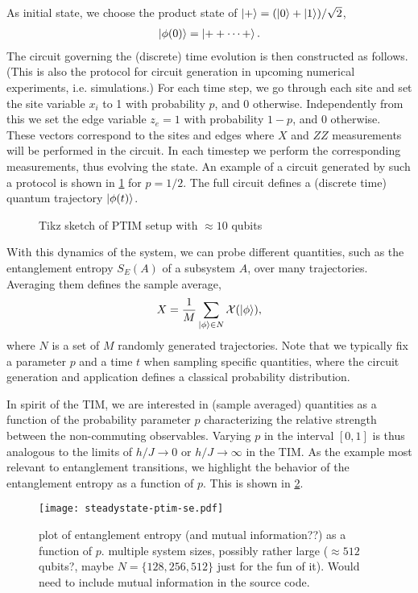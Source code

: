 As initial state, we choose the product state of $\ket{+} = (\ket{0} + \ket{1})
/ \sqrt{2}$,
\begin{align}
  \ket{\phi(0)} = \ket{++\cdots +}
.\end{align}
The circuit governing the (discrete) time evolution is then constructed as
follows. (This is also the protocol for circuit generation in upcoming numerical
experiments, i.e. simulations.) For each time step, we go through each site and
set the site variable $x_i$ to 1 with probability $p$, and 0 otherwise.
Independently from this we set the edge variable $z_e=1$ with probability
$1-p$, and 0 otherwise. These vectors correspond to the sites and edges where
$X$ and $ZZ$ measurements will be performed in the circuit. In each timestep we
perform the corresponding measurements, thus evolving the state. An example of
a circuit generated by such a protocol is shown in \cref{fig:ptim-circuit} for
$p=1 /2$. The full circuit defines a (discrete time) quantum trajectory
$\ket{\phi(t)}$.

\begin{figure}[t]
  \centering
  
  \caption{Tikz sketch of PTIM setup with $\approx 10$ qubits}
  \label{fig:ptim-circuit}
\end{figure}

With this dynamics of the system, we can probe different quantities, such as
the entanglement entropy $S_E(A)$ of a subsystem $A$, over many trajectories.
Averaging them defines the sample average,
\begin{align}
  X = \frac{1}{M} \sum_{\ket{\phi} \in N} \mathcal{X}(\ket{\phi})
,\end{align}
where $N$ is a set of $M$ randomly generated trajectories. Note that we
typically fix a parameter $p$ and a time $t$ when sampling specific quantities,
where the circuit generation and application defines a classical probability
distribution. 

In spirit of the TIM, we are interested in (sample averaged) quantities as a
function of the probability parameter $p$ characterizing the relative strength
between the non-commuting observables. Varying $p$ in the interval $[0,1]$ is
thus analogous to the limits of $h /J \to 0$ or  $h /J \to \infty$ in the TIM.
As the example most relevant to entanglement transitions, we highlight the
behavior of the entanglement entropy as a function of $p$. This is shown in
\cref{fig:phase-transition}.

\begin{figure}[t]
  \centering
  \texttt{[image: steadystate-ptim-se.pdf]}
  \caption{plot of entanglement entropy (and mutual information??) as a
  function of $p$. multiple system sizes, possibly rather large ($\approx 512$
qubits?, maybe $N=\{128,256,512\}$ just for the fun of it). Would need to
include mutual information in the source code.}
  \label{fig:phase-transition}
\end{figure}

